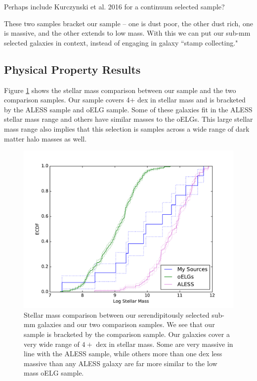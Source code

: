 \documentclass[preprint,natbib209]{aastex}
\begin{document}
Perhaps include Kurczynski et al. 2016 for a continuum selected sample?

These two samples bracket our sample -- one is dust poor, the other dust rich, one is massive, and the other extends to low mass. With this we can put our sub-mm selected galaxies in context, instead of engaging in galaxy ``stamp collecting."

\subsection{Physical Property Results}

Figure \ref{fig:mass_comp} shows the stellar mass comparison between our sample and the two comparison samples. Our sample covers 4+ dex in stellar mass and is bracketed by the ALESS sample and oELG sample. Some of these galaxies fit in the ALESS stellar mass range and others have similar masses to the oELGs. This large stellar mass range also implies that this selection is samples across a wide range of dark matter halo masses as well. 

\begin{figure}[t]
\centering
\includegraphics[scale=0.8]{ecdf_mass.pdf}
\caption{Stellar mass comparison between our serendipitously selected sub-mm galaxies and our two comparison samples. We see that our sample is bracketed by the comparison sample. Our galaxies cover a very wide range of $4+$ dex in stellar mass. Some are very massive in line with the ALESS sample, while others more than one dex less massive than any ALESS galaxy are far more similar to the low mass oELG sample.}
\label{fig:mass_comp}
\end{figure}
\end{document}
